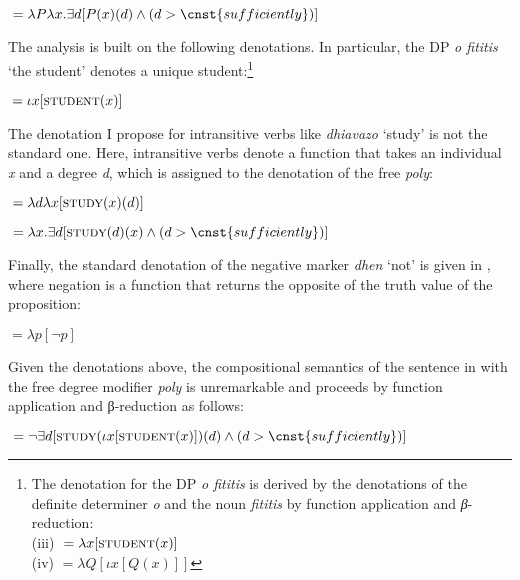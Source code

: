 \documentclass[output=paper]{langscibook}
\begin{document}
\begin{exe}
\ex\label{gia:ex35}
${}= \lambda P\lambda x.\exists d [P (x) (d) \wedge (d > \cnst{sufficiently})]$
\end{exe}

\noindent The analysis is built on the following denotations. In particular, the DP \textit{o fititis} ‘the student’ denotes a unique student:\footnote{The denotation for the DP \textit{o fititis} is derived by the denotations of the definite determiner \textit{o} and the noun \textit{fititis} by function application and \textit{β}-reduction:\\
(iii) ${}= \lambda x[\textsc{student}(x)]$\\ 
(iv) ${}= \lambda Q[\iota x [Q(x)]]$
}

\begin{exe}
\ex\label{gia:ex36}
${}= \iota x [\textsc{student}(x)]$
\end{exe}

\noindent The denotation I propose for intransitive verbs like \textit{dhiavazo} ‘study’ is not the standard one. Here, intransitive verbs denote a function that takes an individual \textit{x} and a degree \textit{d}, which is assigned to the denotation of the free \textit{poly}:

\begin{exe}
\ex\label{gia:ex37}
${}= \lambda d\lambda x[\textsc{study}(x)(d)]$
\end{exe}

\begin{exe}
\ex\label{gia:ex38}
${}= \lambda x.\exists d[\textsc{study}(d)(x) \wedge (d > \cnst{sufficiently})]$
\end{exe}

\noindent Finally, the standard denotation of the negative marker \textit{dhen} ‘not’ is given in , where negation is a function that returns the opposite of the truth value of the proposition:

\begin{exe}
\ex\label{gia:ex39}
${}= \lambda p [\neg p]$
\end{exe}

\noindent Given the denotations above, the compositional semantics of the sentence in  with the free degree modifier \textit{poly} is unremarkable and proceeds by function application and β-reduction as follows:

\begin{exe}
\ex\label{gia:ex40}
${}= \neg \exists d[\textsc{study}(\iota x [\textsc{student}(x)]) (d) \wedge (d > \cnst{sufficiently})]$
\end{exe}
\end{document}

